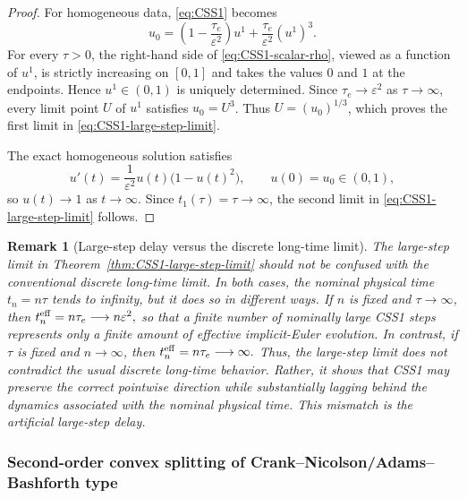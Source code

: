 \documentclass[final, 3p, times]{elsarticle}%
\newcommand{\eps}{\varepsilon}
\newtheorem{remark}[theorem]{Remark}
\begin{document}
\begin{proof}
For homogeneous data, \eqref{eq:CSS1} becomes
\begin{equation}
    u_0
    =\left(1-\frac{\tau_e}{\eps^2}\right)u^1
    +\frac{\tau_e}{\eps^2}(u^1)^3.
    \label{eq:CSS1-scalar-rho}
\end{equation}
For every $\tau>0$, the right-hand side of \eqref{eq:CSS1-scalar-rho},
viewed as a function of $u^1$, is strictly increasing on $[0,1]$ and
takes the values $0$ and $1$ at the endpoints. Hence $u^1\in(0,1)$ is
uniquely determined. Since
$\tau_e\to\eps^2$ as $\tau\to\infty$, every limit point $U$ of
$u^1$ satisfies $u_0=U^3$. Thus $U=(u_0)^{1/3}$, which proves the first
limit in \eqref{eq:CSS1-large-step-limit}.

The exact homogeneous solution satisfies
\[
    u'(t)=\frac{1}{\eps^2}u(t)\bigl(1-u(t)^2\bigr),
    \qquad u(0)=u_0\in(0,1),
\]
so \(u(t)\to1\) as \(t\to\infty\). Since
\(t_1(\tau)=\tau\to\infty\), the second limit in
\eqref{eq:CSS1-large-step-limit} follows.
\end{proof}


\begin{remark}[Large-step delay versus the discrete long-time limit]
The large-step limit in Theorem~\ref{thm:CSS1-large-step-limit} should not be
confused with the conventional discrete long-time limit. In both cases, the
nominal physical time
$t_n=n\tau$
tends to infinity, but it does so in different ways. If \(n\) is fixed and
\(\tau\to\infty\), then
$t_n^{\rm eff}=n\tau_e\longrightarrow n\eps^2,$
so that a finite number of nominally large CSS1 steps represents only a finite
amount of effective implicit-Euler evolution. In contrast, if \(\tau\) is
fixed and \(n\to\infty\), then
$t_n^{\rm eff}=n\tau_e\longrightarrow\infty.$
Thus, the large-step limit does not contradict the usual discrete long-time
behavior. Rather, it shows that CSS1 may preserve the correct pointwise
direction while substantially lagging behind the dynamics associated with the
nominal physical time. This mismatch is the artificial large-step delay.
\end{remark}


\subsubsection{Second-order convex splitting of Crank--Nicolson/Adams--Bashforth type}
\end{document}
